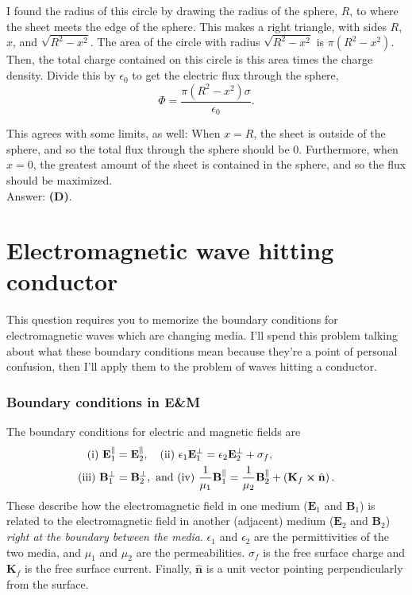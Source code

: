 \documentclass[11pt]{paper}
\newcommand{\answer}[1]{Answer: \textbf{(#1)}.}
\begin{document}
I found the radius of this circle by drawing the radius of the sphere, $R$, to where the sheet meets the edge of the sphere.  This makes a right triangle, with sides $R$, $x$, and $\sqrt{R^2-x^2}$.  The area of the circle with radius $\sqrt{R^2-x^2}$ is $\pi\left(R^2-x^2\right)$.  Then, the total charge contained on this circle is this area times the charge density.  Divide this by $\epsilon_0$ to get the electric flux through the sphere,
\begin{equation}
\Phi = \frac{\pi\left(R^2-x^2\right)\sigma}{\epsilon_0}.
\end{equation}

This agrees with some limits, as well: When $x=R$, the sheet is outside of the sphere, and so the total flux through the sphere should be 0.  Furthermore, when $x=0$, the greatest amount of the sheet is contained in the sphere, and so the flux should be maximized.\\

\answer{D}

\section{Electromagnetic wave hitting conductor}
This question requires you to memorize the boundary conditions for electromagnetic waves which are changing media.  I'll spend this problem talking about what these boundary conditions mean because they're a point of personal confusion, then I'll apply them to the problem of waves hitting a conductor.
\subsubsection*{Boundary conditions in E\&M}
The boundary conditions for electric and magnetic fields are
\begin{align}
\text{(i) } \mathbf{E}_{1}^{\parallel} &= \mathbf{E}_{2}^{\parallel}, \quad \text{(ii) }\epsilon_1\mathbf{E}_{1}^{\perp} = \epsilon_2\mathbf{E}_{2}^{\perp} + \sigma_f,\\
\text{(iii) }\mathbf{B}_{1}^{\perp}&=\mathbf{B}_{2}^{\perp}, \text{ and } \text{(iv) } \frac{1}{\mu_1}\mathbf{B}_{1}^{\parallel} = \frac{1}{\mu_2}\mathbf{B}_{2}^{\parallel} + \left(\mathbf{K}_f \cross \hat{\mathbf{n}}\right).
\end{align}
These describe how the electromagnetic field in one medium ($\mathbf{E}_1$ and $\mathbf{B}_1$) is related to the electromagnetic field in another (adjacent) medium ($\mathbf{E}_2$ and $\mathbf{B}_2$) \emph{right at the boundary between the media}.  $\epsilon_1$ and $\epsilon_2$ are the permittivities of the two media, and $\mu_1$ and $\mu_2$ are the permeabilities.  $\sigma_f$ is the free surface charge and $\mathbf{K}_f$ is the free surface current.  Finally, $\hat{\mathbf{n}}$ is a unit vector pointing perpendicularly from the surface.
\end{document}
